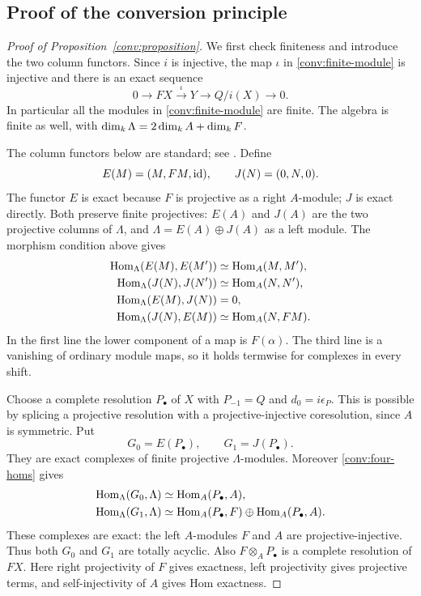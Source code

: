 \subsection{Proof of the conversion principle}


\begin{proof}[Proof of Proposition~\ref{conv:proposition}]
We first check finiteness and introduce the two column functors.
Since $i$ is injective, the
map $\iota$ in \eqref{conv:finite-module} is injective and there is an
exact sequence
\begin{equation}\label{conv:finite-extension}
 0\longrightarrow FX\xrightarrow{\iota}Y
   \longrightarrow Q/i(X)\longrightarrow0.
\end{equation}
In particular all the modules in \eqref{conv:finite-module} are finite.
The algebra is finite as well, with
$\dim_k\Lambda=2\dim_k A+\dim_k F$.

The column functors below are standard; see \cite[Section 2]{EshraghiEtAl2014}.
Define
\[
 E(M)=(M,FM,\operatorname{id}),\qquad J(N)=(0,N,0).
\]
The functor $E$ is exact because $F$ is projective as a right
$A$-module; $J$ is exact directly.  Both preserve finite projectives:
$E(A)$ and $J(A)$ are the two projective columns of $\Lambda$, and
$\Lambda=E(A)\oplus J(A)$ as a left module.  The morphism condition
above gives
\begin{equation}\label{conv:four-homs}
\begin{aligned}
 \operatorname{Hom}_\Lambda(E(M),E(M'))&\simeq\operatorname{Hom}_A(M,M'),\\
 \operatorname{Hom}_\Lambda(J(N),J(N'))&\simeq\operatorname{Hom}_A(N,N'),\\
 \operatorname{Hom}_\Lambda(E(M),J(N))&=0,\\
 \operatorname{Hom}_\Lambda(J(N),E(M))&\simeq\operatorname{Hom}_A(N,FM).
\end{aligned}
\end{equation}
In the first line the lower component of a map is $F(\alpha)$.
The third line is a vanishing of ordinary module maps, so it holds
termwise for complexes in every shift.

Choose a complete resolution $P_\bullet$ of $X$ with
$P_{-1}=Q$ and $d_0=i\epsilon_P$.  This is possible by splicing a
projective resolution with a projective-injective coresolution, since
$A$ is symmetric.  Put
\[
 G_0=E(P_\bullet),\qquad G_1=J(P_\bullet).
\]
They are exact complexes of finite projective $\Lambda$-modules.
Moreover \eqref{conv:four-homs} gives
\begin{align*}
 \operatorname{Hom}_\Lambda(G_0,\Lambda)&\simeq\operatorname{Hom}_A(P_\bullet,A),\\
 \operatorname{Hom}_\Lambda(G_1,\Lambda)&\simeq
       \operatorname{Hom}_A(P_\bullet,F)\oplus\operatorname{Hom}_A(P_\bullet,A).
\end{align*}
These complexes are exact: the left $A$-modules $F$ and $A$ are
projective-injective.  Thus both $G_0$ and $G_1$ are totally acyclic.
Also $F\otimes_A P_\bullet$ is a complete resolution of $FX$.
Here right projectivity of $F$ gives exactness, left projectivity gives
projective terms, and self-injectivity of $A$ gives Hom exactness.


\end{proof}
